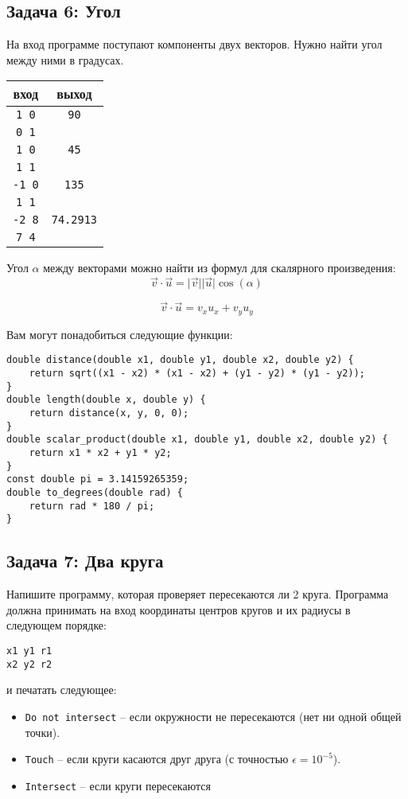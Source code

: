 \documentclass{article}
\begin{document}
\subsection*{Задача 6: Угол}
На вход программе поступают компоненты двух векторов. Нужно найти угол между ними в градусах.
\begin{center}
\begin{tabular}{ c c }
 вход & выход \\ \hline
 \texttt{1 0} & \texttt{90}  \\ 
 \texttt{0 1} &   \\  \hline
 \texttt{1 0} & \texttt{45}  \\ 
 \texttt{1 1} &   \\  \hline
 \texttt{-1 0} & \texttt{135}  \\ 
 \texttt{1 1} &   \\  \hline
 \texttt{-2 8} & \texttt{74.2913}  \\ 
 \texttt{7 4} &   \\
\end{tabular}
\end{center}

Угол $\alpha$ между векторами можно найти из формул для скалярного произведения:
\begin{equation*}
\vec{v} \cdot \vec{u} = \lvert \vec{v} \rvert  \lvert \vec{u} \rvert \cos(\alpha)
\end{equation*}

\begin{equation*}
\vec{v} \cdot \vec{u} = v_x u_x + v_y u_y
\end{equation*}

Вам могут понадобиться следующие функции:
\begin{lstlisting}
double distance(double x1, double y1, double x2, double y2) {
    return sqrt((x1 - x2) * (x1 - x2) + (y1 - y2) * (y1 - y2));
}
double length(double x, double y) {
    return distance(x, y, 0, 0);
}
double scalar_product(double x1, double y1, double x2, double y2) {
    return x1 * x2 + y1 * y2;
}
const double pi = 3.14159265359;
double to_degrees(double rad) {
    return rad * 180 / pi;
}
\end{lstlisting}



\subsection*{Задача 7: Два круга}
Напишите программу, которая проверяет пересекаются ли 2 круга. Программа должна принимать на вход координаты центров кругов и их радиусы в следующем порядке:
\begin{verbatim}
x1 y1 r1
x2 y2 r2
\end{verbatim}
и печатать следующее:
\begin{itemize}
\item \texttt{Do not intersect} -- если окружности не пересекаются (нет ни одной общей точки).
\item \texttt{Touch} -- если круги касаются друг друга (с точностью $\epsilon = 10^{-5}$).
\item \texttt{Intersect} -- если круги пересекаются
\end{itemize}
\end{document}
